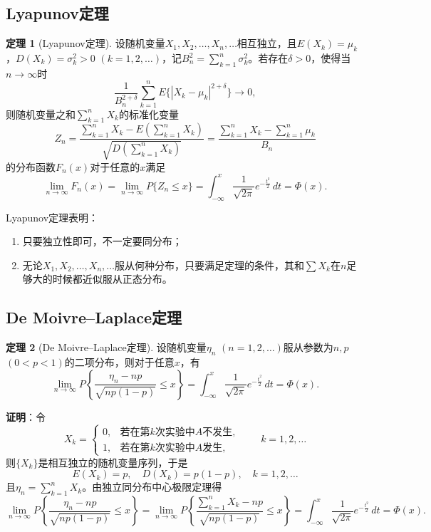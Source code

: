 \documentclass[11pt,a4paper]{report}
\theoremstyle{definition}
\newtheorem{theorem}{定理}[chapter]
\begin{document}
\subsection{Lyapunov定理}

\begin{theorem}[Lyapunov定理]
设随机变量$X_{1},X_{2},\ldots,X_{n},\ldots$相互独立，且$E(X_{k})=\mu_{k}$，$D(X_{k})=\sigma_{k}^{2}>0$ $(k=1,2,\ldots)$，记$B_{n}^{2}=\sum_{k=1}^{n}\sigma_{k}^{2}$。若存在$\delta>0$，使得当$n\to\infty$时
\[
\frac{1}{B_{n}^{2+\delta}}\sum_{k=1}^{n}E\bigl\{|X_{k}-\mu_{k}|^{2+\delta}\bigr\}\to0,
\]
则随机变量之和$\sum_{k=1}^{n}X_{k}$的标准化变量
\[
Z_{n}=\frac{\sum_{k=1}^{n}X_{k}-E\left(\sum_{k=1}^{n}X_{k}\right)}{\sqrt{D\left(\sum_{k=1}^{n}X_{k}\right)}}=\frac{\sum_{k=1}^{n}X_{k}-\sum_{k=1}^{n}\mu_{k}}{B_{n}}
\]
的分布函数$F_{n}(x)$对于任意的$x$满足
\[
\lim_{n\to\infty}F_{n}(x)=\lim_{n\to\infty}P\{Z_{n}\leq x\}=\int_{-\infty}^{x}\frac{1}{\sqrt{2\pi}}e^{-\frac{t^{2}}{2}}\,dt=\Phi(x).
\]
\end{theorem}

Lyapunov定理表明：
\begin{enumerate}[label=\arabic*.,leftmargin=2em]
    \item 只要独立性即可，不一定要同分布；
    \item 无论$X_{1},X_{2},\ldots,X_{n},\ldots$服从何种分布，只要满足定理的条件，其和$\sum X_{k}$在$n$足够大的时候都近似服从正态分布。
\end{enumerate}

\subsection{De Moivre--Laplace定理}

\begin{theorem}[De Moivre--Laplace定理]
设随机变量$\eta_{n}$ $(n=1,2,\ldots)$服从参数为$n,p$ $(0<p<1)$的二项分布，则对于任意$x$，有
\[
\lim_{n\to\infty}P\left\{\frac{\eta_{n}-np}{\sqrt{np(1-p)}}\leq x\right\}=\int_{-\infty}^{x}\frac{1}{\sqrt{2\pi}}e^{-\frac{t^{2}}{2}}\,dt=\Phi(x).
\]
\end{theorem}

\textbf{证明}：令
\[
X_{k}=
\begin{cases}
0, & \text{若在第}k\text{次实验中}A\text{不发生},\\[0.3em]
1, & \text{若在第}k\text{次实验中}A\text{发生},
\end{cases}
\qquad k=1,2,\ldots
\]
则$\{X_{k}\}$是相互独立的随机变量序列，于是
\[
E(X_{k})=p,\quad D(X_{k})=p(1-p),\quad k=1,2,\ldots
\]
且$\eta_{n}=\sum_{k=1}^{n}X_{k}$。由独立同分布中心极限定理得
\[
\lim_{n\to\infty}P\left\{\frac{\eta_{n}-np}{\sqrt{np(1-p)}}\leq x\right\}=\lim_{n\to\infty}P\left\{\frac{\sum_{k=1}^{n}X_{k}-np}{\sqrt{np(1-p)}}\leq x\right\}=\int_{-\infty}^{x}\frac{1}{\sqrt{2\pi}}e^{-\frac{t^{2}}{2}}\,dt=\Phi(x).
\]
\end{document}
